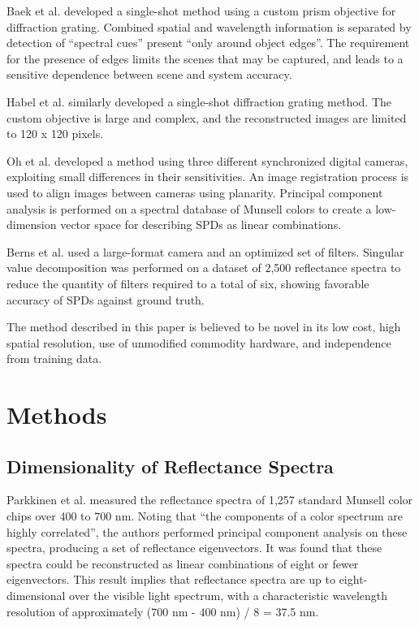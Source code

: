 \documentclass[twocolumn,10pt]{asme2ej}
\newcommand{\id}{\hspace{6 mm}}
\begin{document}
\id Baek et al. \cite{Baek} developed a single-shot method using a custom prism objective for diffraction grating. Combined spatial and wavelength information is separated by detection of ``spectral cues'' present ``only around object edges''. The requirement for the presence of edges limits the scenes that may be captured, and leads to a sensitive dependence between scene and system accuracy.

\id Habel et al. \cite{Habel} similarly developed a single-shot diffraction grating method. The custom objective is large and complex, and the reconstructed images are limited to 120 x 120 pixels.

\id Oh et al. \cite{Oh} developed a method using three different synchronized digital cameras, exploiting small differences in their sensitivities. An image registration process is used to align images between cameras using planarity. Principal component analysis is performed on a spectral database of Munsell colors to create a low-dimension vector space for describing SPDs as linear combinations.

\id Berns et al. \cite{Berns} used a large-format camera and an optimized set of filters. Singular value decomposition was performed on a dataset of 2,500 reflectance spectra to reduce the quantity of filters required to a total of six, showing favorable accuracy of SPDs against ground truth.

\id The method described in this paper is believed to be novel in its low cost, high spatial resolution, use of unmodified commodity hardware, and independence from training data.

\section{Methods}

\subsection{Dimensionality of Reflectance Spectra}
\label{dimensionality}

Parkkinen et al. \cite{Parkkinen} measured the reflectance spectra of 1,257 standard Munsell color chips over 400 to 700 nm. Noting that ``the components of a color spectrum are highly correlated'', the authors performed principal component analysis on these spectra, producing a set of reflectance eigenvectors. It was found that these spectra could be reconstructed as linear combinations of eight or fewer eigenvectors. This result implies that reflectance spectra are up to eight-dimensional over the visible light spectrum, with a characteristic wavelength resolution of approximately (700 nm - 400 nm) / 8 = 37.5 nm.
\end{document}
